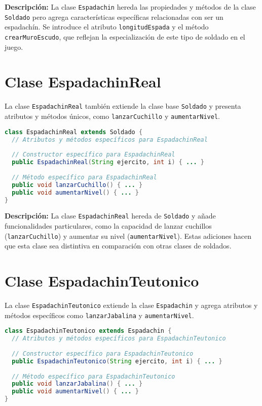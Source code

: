 \textbf{Descripción:} La clase \texttt{Espadachin} hereda las propiedades y métodos de la clase \texttt{Soldado} pero agrega características específicas relacionadas con ser un espadachín. Se introduce el atributo \texttt{longitudEspada} y el método \texttt{crearMuroEscudo}, que reflejan la especialización de este tipo de soldado en el juego.

\section{Clase EspadachinReal}

La clase \texttt{EspadachinReal} también extiende la clase base \texttt{Soldado} y presenta atributos y métodos únicos, como \texttt{lanzarCuchillo} y \texttt{aumentarNivel}.

\begin{lstlisting}[language=Java]
class EspadachinReal extends Soldado {
  // Atributos y métodos específicos para EspadachinReal
  
  // Constructor específico para EspadachinReal
  public EspadachinReal(String ejercito, int i) { ... }
  
  // Método específico para EspadachinReal
  public void lanzarCuchillo() { ... }
  public void aumentarNivel() { ... }
}
\end{lstlisting}

\textbf{Descripción:} La clase \texttt{EspadachinReal} hereda de \texttt{Soldado} y añade funcionalidades particulares, como la capacidad de lanzar cuchillos (\texttt{lanzarCuchillo}) y aumentar su nivel (\texttt{aumentarNivel}). Estas adiciones hacen que esta clase sea distintiva en comparación con otras clases de soldados.

\section{Clase EspadachinTeutonico}

La clase \texttt{EspadachinTeutonico} extiende la clase \texttt{Espadachin} y agrega atributos y métodos específicos como \texttt{lanzarJabalina} y \texttt{aumentarNivel}.

\begin{lstlisting}[language=Java]
class EspadachinTeutonico extends Espadachin {
  // Atributos y métodos específicos para EspadachinTeutonico
  
  // Constructor específico para EspadachinTeutonico
  public EspadachinTeutonico(String ejercito, int i) { ... }
  
  // Método específico para EspadachinTeutonico
  public void lanzarJabalina() { ... }
  public void aumentarNivel() { ... }
}
\end{lstlisting}

